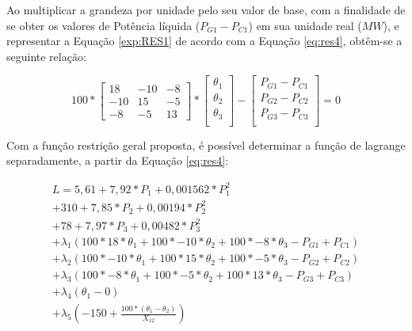  	Ao multiplicar a grandeza por unidade pelo seu valor de base, com a finalidade de se obter os valores de Potência líquida ($P_{G1} - P_{C1}$) em sua unidade real ($MW$), e representar a Equação \ref{exp:RES1} de acordo com a Equação \ref{eq:res4}, obtêm-se a seguinte relação:
 	
 	\begin{equation}
		100*\begin{bmatrix}
       18 & -10 & -8 \\
       -10 & 15 & -5 \\
       -8 & -5 & 13\end{bmatrix} * 
       \begin{bmatrix}
       	\theta{_1} \\
       	\theta{_2} \\
       	\theta{_3} \\
       \end{bmatrix} - 
       \begin{bmatrix}
       	P_{G1} - P_{C1} \\
       	P_{G2} - P_{C2} \\
       	P_{G3} - P_{C3} \\
       \end{bmatrix} = 0
       \label{exp:RES2}
	\end{equation}
	
	Com a função restrição geral proposta, é possível determinar a função de lagrange separadamente, a partir da Equação \ref{eq:res4}:
	
	\begin{align}
		L =  5,61 + 7,92*P_1 + 0,001562*P_1^2 \label{lag1}\\
		+ 310 + 7,85*P_2 + 0,00194*P_2^2
			\label{lag2}\\ 
		+ 78 + 7,97*P_3 + 0,00482*P_3^2 
			\label{lag3}\\
		+ \lambda{_1}(100*18*\theta{_1} + 100*-10*\theta{_2} + 100*-8*\theta{_3} - P_{G1} + P_{C1})
			\label{lag4}\\
		+ \lambda{_2}(100*-10*\theta{_1} + 100*15*\theta{_2} + 100*-5*\theta{_3} - P_{G2} + P_{C2})
			\label{lag5}\\
		+ \lambda{_3}(100*-8*\theta{_1} + 100*-5*\theta{_2} + 100*13*\theta{_3} - P_{G3} + P_{C3})
			\label{lag6}\\
		+ \lambda{_4}(\theta{_1} - 0)
			\label{lag7}\\
		+ \lambda{_5}(-150 + \frac{100*(\theta{_1} - \theta{_2})}{X_{12}}) \label{lag8}
		\end{align}
		
